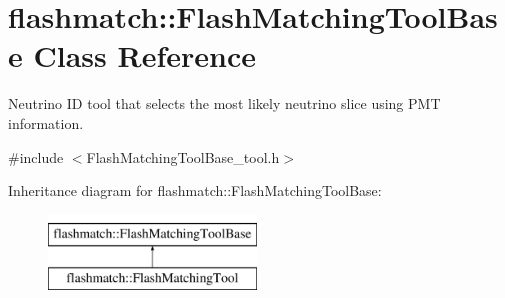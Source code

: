 \hypertarget{classflashmatch_1_1FlashMatchingToolBase}{\section{flashmatch\-:\-:Flash\-Matching\-Tool\-Base Class Reference}
\label{classflashmatch_1_1FlashMatchingToolBase}
}


Neutrino I\-D tool that selects the most likely neutrino slice using P\-M\-T information.  




{\ttfamily \#include $<$Flash\-Matching\-Tool\-Base\-\_\-tool.\-h$>$}

Inheritance diagram for flashmatch\-:\-:Flash\-Matching\-Tool\-Base\-:\begin{figure}[H]
\begin{center}
\leavevmode
\includegraphics[height=2.000000cm]{classflashmatch_1_1FlashMatchingToolBase}
\end{center}
\end{figure}
